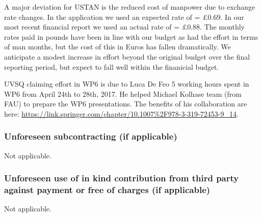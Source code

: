 
A major deviation for USTAN is the reduced cost of manpower due to exchange rate changes. In the application
we used an expected rate of  = \pounds 0.69. In our most recent financial report we used an actual
rate of  = \pounds 0.88. The monthly rates paid in pounds have been in line with our budget as had the 
effort in terms of man months, but the cost of this in Euros has fallen dramatically. We anticipate a modest increase in 
effort beyond the original budget over the final reporting period, but expect to fall well within the finanicial budget.

UVSQ claiming effort in WP6 is due to Luca De Feo 5 working hours spent in WP6 from April 24th to 28th, 2017. He helped Michael 
Kolhase team (from FAU) to prepare the WP6 presentations. The benefits of his collaboration are here: 
\url{https://link.springer.com/chapter/10.1007%2F978-3-319-72453-9_14}.


\subsubsection{Unforeseen subcontracting (if applicable)}

Not applicable.

\subsubsection{Unforeseen use of in kind contribution from third party against payment or
  free of charges (if applicable)}

 Not applicable. 
